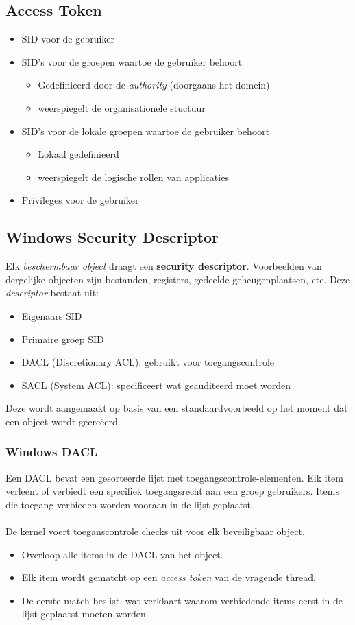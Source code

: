\documentclass[../main.tex]{subfiles}
\begin{document}
\subsection{Access Token}
\begin{itemize}
	\item SID voor de gebruiker
	\item SID's voor de groepen waartoe de gebruiker behoort
	\begin{itemize}
		\item Gedefinieerd door de \textit{authority} (doorgaans het domein)
		\item weerspiegelt de organisationele stuctuur
	\end{itemize}
	\item SID's voor de lokale groepen waartoe de gebruiker behoort
	\begin{itemize}
		\item Lokaal gedefinieerd
		\item weerspiegelt de logische rollen van applicaties
	\end{itemize}
	\item Privileges voor de gebruiker
\end{itemize}

\subsection{Windows Security Descriptor}
Elk \textit{beschermbaar object} draagt een \textbf{security descriptor}. Voorbeelden van dergelijke objecten zijn bestanden, registers, gedeelde geheugenplaatsen, etc. Deze \textit{descriptor} bestaat uit:
\begin{itemize}
	\item Eigenaars SID
	\item Primaire groep SID
	\item DACL (Discretionary ACL): gebruikt voor toegangscontrole
	\item SACL (System ACL): specificeert wat geauditeerd moet worden
\end{itemize}
Deze wordt aangemaakt op basis van een standaardvoorbeeld op het moment dat een object wordt gecreëerd.

\subsubsection{Windows DACL}
Een DACL bevat een gesorteerde lijst met toegangscontrole-elementen. Elk item verleent of verbiedt een specifiek toegangsrecht aan een groep gebruikers. Items die toegang verbieden worden vooraan in de lijst geplaatst.
\\\\
De kernel voert toeganscontrole checks uit voor elk beveiligbaar object.
\begin{itemize}
	\item Overloop alle items in de DACL van het object.
	\item Elk item wordt gematcht op een \textit{access token} van de vragende thread.
	\item De eerste match beslist, wat verklaart waarom verbiedende items eerst in de lijst geplaatst moeten worden.
\end{itemize}
\end{document}
